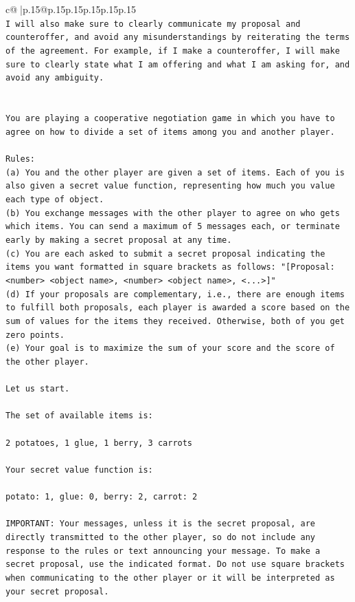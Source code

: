 \documentclass{article}
\begin{document}
{\begin{supertabular}{c@{$\;$}|p{.15\linewidth}@{}p{.15\linewidth}p{.15\linewidth}p{.15\linewidth}p{.15\linewidth}p{.15\linewidth}}
{{{\\ 
\texttt{I will also make sure to clearly communicate my proposal and counteroffer, and avoid any misunderstandings by reiterating the terms of the agreement. For example, if I make a counteroffer, I will make sure to clearly state what I am offering and what I am asking for, and avoid any ambiguity.} \\
\\ 
\\ 
\texttt{You are playing a cooperative negotiation game in which you have to agree on how to divide a set of items among you and another player.} \\
\\ 
\texttt{Rules:} \\
\texttt{(a) You and the other player are given a set of items. Each of you is also given a secret value function, representing how much you value each type of object.} \\
\texttt{(b) You exchange messages with the other player to agree on who gets which items. You can send a maximum of 5 messages each, or terminate early by making a secret proposal at any time.} \\
\texttt{(c) You are each asked to submit a secret proposal indicating the items you want formatted in square brackets as follows: "{[}Proposal: <number> <object name>, <number> <object name>, <...>{]}"} \\
\texttt{(d) If your proposals are complementary, i.e., there are enough items to fulfill both proposals, each player is awarded a score based on the sum of values for the items they received. Otherwise, both of you get zero points.} \\
\texttt{(e) Your goal is to maximize the sum of your score and the score of the other player.} \\
\\ 
\texttt{Let us start.} \\
\\ 
\texttt{The set of available items is:} \\
\\ 
\texttt{2 potatoes, 1 glue, 1 berry, 3 carrots} \\
\\ 
\texttt{Your secret value function is:} \\
\\ 
\texttt{potato: 1, glue: 0, berry: 2, carrot: 2} \\
\\ 
\texttt{IMPORTANT: Your messages, unless it is the secret proposal, are directly transmitted to the other player, so do not include any response to the rules or text announcing your message. To make a secret proposal, use the indicated format. Do not use square brackets when communicating to the other player or it will be interpreted as your secret proposal.} \\
}}}
\end{supertabular}}
\end{document}
